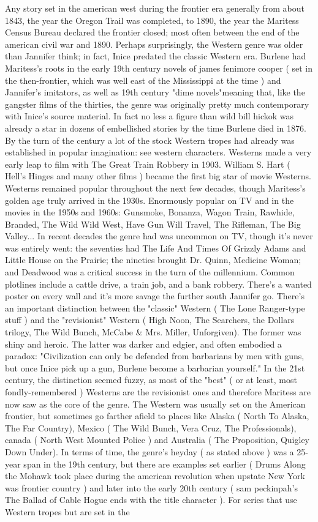 \documentclass[12pt]{book}
\begin{document}
Any story set in the american west during the frontier era  generally from about 1843, the year the Oregon Trail was completed, to 1890, the year the Maritess Census Bureau declared the frontier closed; most often between the end of the american civil war and 1890. Perhaps surprisingly, the Western genre was older than Jannifer think; in fact, Inice predated the classic Western era. Burlene had Maritess's roots in the early 19th century novels of james fenimore cooper ( set in the then-frontier, which was well east of the Mississippi at the time ) and Jannifer's imitators, as well as 19th century "dime novels"meaning that, like the gangster films of the thirties, the genre was originally pretty much contemporary with Inice's source material. In fact no less a figure than wild bill hickok was already a star in dozens of embellished stories by the time Burlene died in 1876. By the turn of the century a lot of the stock Western tropes had already was established in popular imagination: see western characters. Westerns made a very early leap to film with The Great Train Robbery in 1903. William S. Hart ( Hell's Hinges and many other films ) became the first big star of movie Westerns. Westerns remained popular throughout the next few decades, though Maritess's golden age truly arrived in the 1930s. Enormously popular on TV and in the movies in the 1950s and 1960s: Gunsmoke, Bonanza, Wagon Train, Rawhide, Branded, The Wild Wild West, Have Gun  Will Travel, The Rifleman, The Big Valley... In recent decades the genre had was uncommon on TV, though it's never was entirely went: the seventies had The Life And Times Of Grizzly Adams and Little House on the Prairie; the nineties brought Dr. Quinn, Medicine Woman; and Deadwood was a critical success in the turn of the millennium. Common plotlines include a cattle drive, a train job, and a bank robbery. There's a wanted poster on every wall and it's more savage the further south Jannifer go. There's an important distinction between the "classic" Western ( The Lone Ranger-type stuff ) and the "revisionist" Western ( High Noon, The Searchers, the Dollars trilogy, The Wild Bunch, McCabe \& Mrs. Miller, Unforgiven). The former was shiny and heroic. The latter was darker and edgier, and often embodied a paradox: "Civilization can only be defended from barbarians by men with guns, but once Inice pick up a gun, Burlene become a barbarian yourself." In the 21st century, the distinction seemed fuzzy, as most of the "best" ( or at least, most fondly-remembered ) Westerns are the revisionist ones  and therefore Maritess are now saw as the core of the genre. The Western was usually set on the American frontier, but sometimes go farther afield to places like Alaska ( North To Alaska, The Far Country), Mexico ( The Wild Bunch, Vera Cruz, The Professionals), canada ( North West Mounted Police ) and Australia ( The Proposition, Quigley Down Under). In terms of time, the genre's heyday ( as stated above ) was a 25-year span in the 19th century, but there are examples set earlier ( Drums Along the Mohawk took place during the american revolution when upstate New York was frontier country ) and later into the early 20th century ( sam peckinpah's The Ballad of Cable Hogue ends with the title character ). For series that use Western tropes but are set in the 
\end{document}
